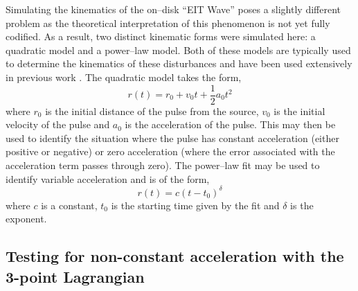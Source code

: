\documentclass[structabstract]{aa}
\begin{document}
Simulating the kinematics of the on--disk ``EIT Wave'' poses a slightly different problem as the theoretical interpretation of this phenomenon is not yet fully codified. As a result, two distinct kinematic forms were simulated here: a quadratic model and a power--law model. Both of these models are typically used to determine the kinematics of these disturbances and have been used extensively in previous work \citep[e.g.,][]{Long:2008,Veronig:2008,Warmuth:2004,Muhr:2011}. The quadratic model takes the form,
\begin{equation}
r(t) = r_0 + v_0 t + \frac{1}{2}a_0 t^2
\end{equation}
where $r_0$ is the initial distance of the pulse from the source, $v_0$ is the initial velocity of the pulse and $a_0$ is the acceleration of the pulse. This may then be used to identify the situation where the pulse has constant acceleration (either positive or negative) or zero acceleration (where the error associated with the acceleration term passes through zero). The power--law fit may be used to identify variable acceleration and is of the form,
\begin{equation}
r(t) = c(t - t_0)^{\delta}
\end{equation}
where $c$ is a constant, $t_0$ is the starting time given by the fit and $\delta$ is the exponent.


\subsection{Testing for non-constant acceleration with the 3-point Lagrangian}
\end{document}
